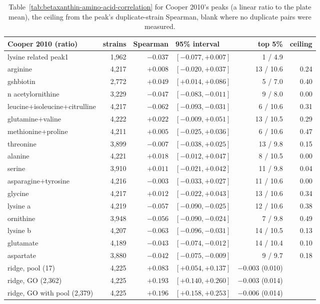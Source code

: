 \begin{table}[H]
  \centering
  \footnotesize
  \caption[Betaxanthin against the Cooper peaks]{Table~\ref{tab:betaxanthin-amino-acid-correlation} for Cooper 2010's peaks (a linear ratio to the plate mean), the ceiling from the peak's duplicate-strain Spearman, blank where no duplicate pairs were measured.}
  \label{tab:betaxanthin-amino-acid-correlation-cooper}
  \begin{tabular}{@{}lrrlrr@{}}
    \hline
    Cooper 2010 (ratio) & strains & Spearman & 95\% interval & top 5\% & ceiling \\
    \hline
    lysine related peak1 & 1,962 & $-0.037$ & $[-0.077, +0.007]$ & 1 / 4.9 &  \\
    arginine & 4,217 & $+0.008$ & $[-0.020, +0.037]$ & 13 / 10.6 & 0.24 \\
    gshbiotin & 2,772 & $+0.049$ & $[+0.014, +0.086]$ & 5 / 7.0 & 0.40 \\
    n acetylornithine & 3,229 & $-0.047$ & $[-0.083, -0.011]$ & 9 / 8.0 & 0.00 \\
    leucine+isoleucine+citrulline & 4,217 & $-0.062$ & $[-0.093, -0.031]$ & 6 / 10.6 & 0.31 \\
    glutamine+valine & 4,222 & $+0.022$ & $[-0.009, +0.051]$ & 13 / 10.5 & 0.29 \\
    methionine+proline & 4,211 & $+0.005$ & $[-0.025, +0.036]$ & 6 / 10.6 & 0.47 \\
    threonine & 3,899 & $-0.007$ & $[-0.038, +0.025]$ & 13 / 9.8 & 0.15 \\
    alanine & 4,221 & $+0.018$ & $[-0.012, +0.047]$ & 8 / 10.5 & 0.00 \\
    serine & 3,910 & $+0.011$ & $[-0.021, +0.042]$ & 11 / 9.8 & 0.04 \\
    asparagine+tyrosine & 4,216 & $-0.003$ & $[-0.033, +0.027]$ & 11 / 10.6 & 0.00 \\
    glycine & 4,217 & $+0.012$ & $[-0.022, +0.043]$ & 13 / 10.6 & 0.34 \\
    lysine a & 4,219 & $-0.057$ & $[-0.090, -0.025]$ & 12 / 10.6 & 0.38 \\
    ornithine & 3,948 & $-0.056$ & $[-0.090, -0.024]$ & 7 / 9.8 & 0.49 \\
    lysine b & 4,207 & $-0.063$ & $[-0.096, -0.031]$ & 14 / 10.5 & 0.13 \\
    glutamate & 4,189 & $-0.043$ & $[-0.074, -0.012]$ & 14 / 10.4 & 0.10 \\
    aspartate & 3,880 & $-0.042$ & $[-0.075, -0.009]$ & 9 / 9.7 & 0.18 \\
    ridge, pool (17) & 4,225 & $+0.083$ & $[+0.054, +0.137]$ & $-0.003$ (0.010) & \\
    ridge, GO (2,362) & 4,225 & $+0.193$ & $[+0.140, +0.260]$ & $-0.003$ (0.014) & \\
    ridge, GO with pool (2,379) & 4,225 & $+0.196$ & $[+0.158, +0.253]$ & $-0.006$ (0.014) & \\
    \hline
  \end{tabular}
\end{table}


